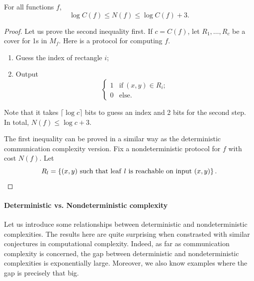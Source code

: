 \documentclass[usletter]{article}
\providecommand\cbrac[1]{\ensuremath \left\{#1\right\}}
\newcommand{\mf}{M_f}
\newcommand{\nf}{N(f)}
\newcommand{\cf}{C(f)}
\begin{document}
\begin{theorem}
For all functions $f$,
$$
\log \cf \leq \nf \leq \log \cf + 3.
$$
\end{theorem}
\begin{proof}
Let us prove the second inequality first. If $c = \cf$, let $R_1, \ldots, R_c$ be a cover for 1s in $\mf$. Here is a protocol for computing $f$.
\begin{enumerate}
    \item Guess the index of rectangle $i$;
    \item Output
        $$
            \begin{cases}
            1 & \mathrm{if}\ (x,y) \in R_i;\\
            0 & \mathrm{else.}
            \end{cases}
         $$
\end{enumerate}
Note that it takes $\lceil \log c \rceil$ bits to guess an index and 2 bits for the second step. In total, $\nf \leq \log c + 3$.

The first inequality can be proved in a similar way as the deterministic communication complexity version. Fix a nondeterministic protocol for $f$ with cost $\nf$. Let
$$
R_l = \cbrac{ (x,y)\ \mathrm{such\ that\ leaf}\ l\ \mathrm{is\ reachable\ on\ input}\ (x,y) }.
$$

\end{proof}


\paragraph{Deterministic vs. Nondeterministic complexity}
Let us introduce some relationships between deterministic and nondeterministic complexities. The results here are quite surprising when constrasted with similar conjectures in computational complexity. Indeed, as far as communication complexity is concerned, the gap between deterministic and nondeterministic complexities is exponentially large. Moreover, we also know examples where the gap is precisely that big.
\end{document}
